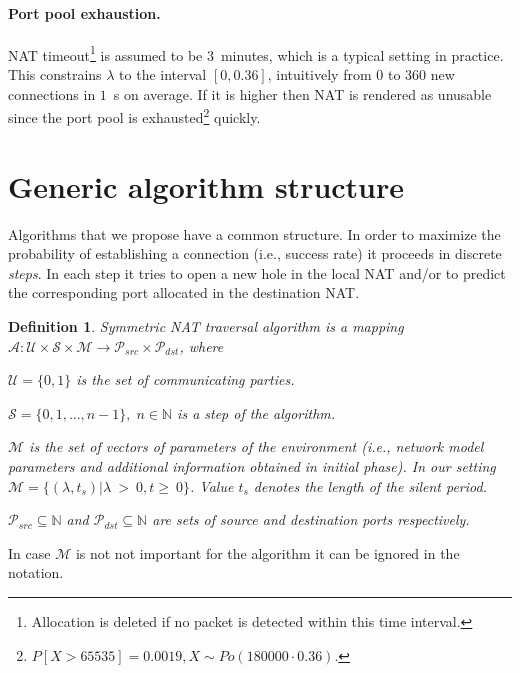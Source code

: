 \documentclass{llncs}
\newtheorem{mydef}{Definition}
\begin{document}
\paragraph{Port pool exhaustion.} NAT timeout\footnote{Allocation is deleted if no packet is detected within this time interval.} is assumed to be 3~minutes, 
which is a typical setting in practice. This constrains $\lambda$ to the interval $[0, 0.36]$, intuitively from $0$ to $360$ new connections in $1$~s on average. 
If it is higher then NAT is rendered as unusable since the port pool is exhausted\footnote{$P[X > 65535] = 0.0019, X \sim Po(180000 \cdot 0.36)$.} quickly.

\section{Generic algorithm structure}
Algorithms that we propose have a common structure. In order to maximize the probability of establishing
a connection (i.e., success rate) it proceeds in discrete \emph{steps}. In each step it 
tries to open a new hole in the local NAT and/or to predict the corresponding port allocated in the destination
NAT.

\begin{mydef}
Symmetric NAT traversal algorithm is a mapping 
$\mathcal{A}: \mathcal{U} \times \mathcal{S} \times \mathcal{M} \rightarrow \mathcal{P}_{src} \times \mathcal{P}_{dst}$, 
where \\
\begin{compactitem}
\item $\mathcal{U}=\{0,1\}$ is the set of communicating parties.
\item $\mathcal{S} = \{0, 1, \dots, n-1\}, \; n \in \mathbb{N}$ is a step of the algorithm.
\item $\mathcal{M}$ is the set of vectors of parameters of the environment (i.e., network model 
parameters and additional information obtained in initial phase). 
In our setting $\mathcal{M} = \{ (\lambda, t_s) | \lambda~>~0, t\geq~0 \}$. Value $t_s$ denotes the length of the silent period. %
\item $\mathcal{P}_{src} \subseteq \mathbb{N}$ and $\mathcal{P}_{dst} \subseteq \mathbb{N}$
are sets of source and destination ports respectively.
\end{compactitem}
\end{mydef}
In case $\mathcal{M}$ is not not important for the algorithm it can be ignored in the notation.
\end{document}
